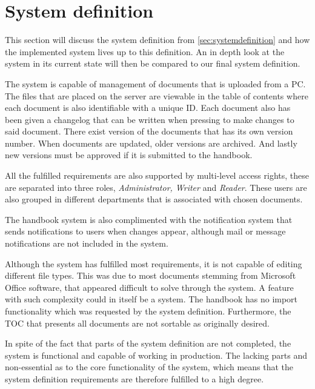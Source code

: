 \section{System definition}\label{sec:dissystemdef}

This section will discuss the system definition from \cref{sec:systemdefinition} and how the implemented system lives up to this definition.
An in depth look at the system in its current state will then be compared to our final system definition.

The system is capable of management of documents that is uploaded from a PC.
The files that are placed on the server are viewable in the table of contents where each document is also identifiable with a unique ID.
Each document also has been given a changelog that can be written when pressing to make changes to said document.
There exist version of the documents that has its own version number.
When documents are updated, older versions are archived.
And lastly new versions must be approved if it is submitted to the handbook.

All the fulfilled requirements are also supported by multi-level access rights, these are separated into three roles, \textit{Administrator, Writer} and \textit{Reader}.
These users are also grouped in different departments that is associated with chosen documents.

The handbook system is also complimented with the notification system that sends notifications to users when changes appear, although mail or message notifications are not included in the system.

Although the system has fulfilled most requirements, it is not capable of editing different file types.
This was due to most documents stemming from Microsoft Office software, that appeared difficult to solve through the system.
A feature with such complexity could in itself be a system.
The handbook has no import functionality which was requested by the system definition.
Furthermore, the TOC that presents all documents are not sortable as originally desired.

In spite of the fact that parts of the system definition are not completed, the system is functional and capable of working in production.
The lacking parts and non-essential as to the core functionality of the system, which means that the system definition requirements are therefore fulfilled to a high degree.

